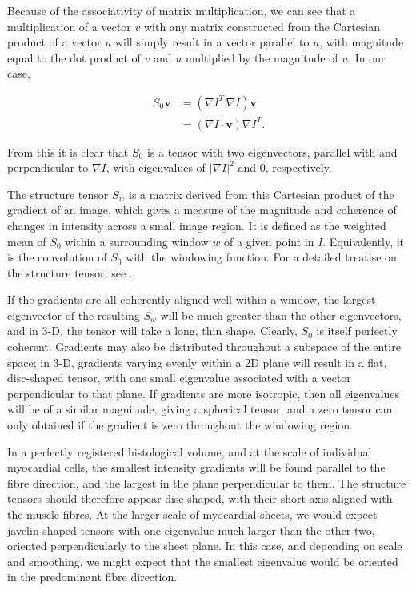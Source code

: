     Because of the associativity of matrix multiplication, we can see that a multiplication of a vector $v$ with any matrix constructed from the Cartesian product of a vector $u$ will simply result in a vector parallel to $u$, with magnitude equal to the dot product of $v$ and $u$ multiplied by the magnitude of $u$. In our case,
  
    \begin{align}
      S_0 \mathbf{v} &= (\nabla I^T \, \nabla I) \mathbf{v} \\
                     &= (\nabla I \cdot \mathbf{v}) \nabla I^T.
    \end{align}
  
    From this it is clear that $S_0$ is a tensor with two eigenvectors, parallel with and perpendicular to $\nabla I$, with eigenvalues of $|\nabla I|^2$ and 0, respectively.
  
    The structure tensor $S_w$ is a matrix derived from this Cartesian product of the gradient of an image, which gives a measure of the magnitude and coherence of changes in intensity across a small image region. It is defined as the weighted mean of $S_0$ within a surrounding window $w$ of a given point in $I$. Equivalently, it is the convolution of $S_0$ with the windowing function. For a detailed treatise on the structure tensor, see \cite{Knutsson2004,Knutsson2011}.
  
    If the gradients are all coherently aligned well within a window, the largest eigenvector of the resulting $S_w$ will be much greater than the other eigenvectors, and in 3-D, the tensor will take a long, thin shape. Clearly, $S_0$ is itself perfectly coherent. Gradients may also be distributed throughout a subspace of the entire space; in 3-D, gradients varying evenly within a 2D plane will result in a flat, disc-shaped tensor, with one small eigenvalue associated with a vector perpendicular to that plane. If gradients are more isotropic, then all eigenvalues will be of a similar magnitude, giving a spherical tensor, and a zero tensor can only obtained if the gradient is zero throughout the windowing region.
  
    In a perfectly registered histological volume, and at the scale of individual myocardial cells, the smallest intensity gradients will be found parallel to the fibre direction, and the largest in the plane perpendicular to them. The structure tensors should therefore appear disc-shaped, with their short axis aligned with the muscle fibres. At the larger scale of myocardial sheets, we would expect javelin-shaped tensors with one eigenvalue much larger than the other two, oriented perpendicularly to the sheet plane. In this case, and depending on scale and smoothing, we might expect that the smallest eigenvalue would be oriented in the predominant fibre direction.
